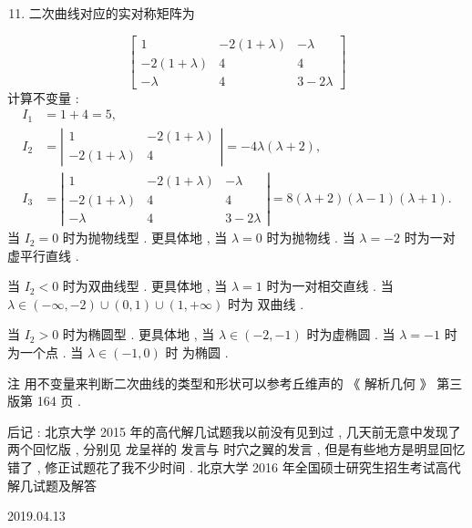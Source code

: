 \documentclass[10pt]{article}
\begin{document}
\begin{enumerate}
  \setcounter{enumi}{10}
  \item  二次曲线对应的实对称矩阵为 
\end{enumerate}
$$
\left[\begin{array}{ccc}
1 & -2(1+\lambda) & -\lambda \\
-2(1+\lambda) & 4 & 4 \\
-\lambda & 4 & 3-2 \lambda
\end{array}\right]
$$
 计算不变量 :
$$
\begin{aligned}
I_{1} &=1+4=5, \\
I_{2} &=\left|\begin{array}{ccc}
1 & -2(1+\lambda) \\
-2(1+\lambda) & 4
\end{array}\right|=-4 \lambda(\lambda+2), \\
I_{3} &=\left|\begin{array}{ccc}
1 & -2(1+\lambda) & -\lambda \\
-2(1+\lambda) & 4 & 4 \\
-\lambda & 4 & 3-2 \lambda
\end{array}\right|=8(\lambda+2)(\lambda-1)(\lambda+1) .
\end{aligned}
$$
 当  $I_{2}=0$  时为抛物线型 .  更具体地 ,  当  $\lambda=0$  时为抛物线 .  当  $\lambda=-2$  时为一对虚平行直线 .

 当  $I_{2}<0$  时为双曲线型 .  更具体地 ,  当  $\lambda=1$  时为一对相交直线 .  当  $\lambda \in(-\infty,-2) \cup(0,1) \cup(1,+\infty)$  时为   双曲线 .

 当  $I_{2}>0$  时为椭圆型 .  更具体地 ,  当  $\lambda \in(-2,-1)$  时为虚椭圆 .  当  $\lambda=-1$  时为一个点 .  当  $\lambda \in(-1,0)$  时   为椭圆 .

 注   用不变量来判断二次曲线的类型和形状可以参考丘维声的 《 解析几何 》 第三版第  164  页 .

 后记 :  北京大学  2015  年的高代解几试题我以前没有见到过 ,  几天前无意中发现了两个回忆版 ,  分别见   龙呈祥的   发言与   时穴之翼的发言 ,  但是有些地方是明显回忆错了 ,  修正试题花了我不少时间 .  北京大学  2016  年全国硕士研究生招生考试高代解几试题及解答 

   

2019.04.13
\end{document}
